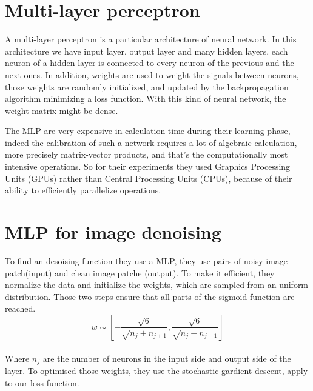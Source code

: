 \documentclass[10pt,a4paper]{article}
\newcommand{\svs}{\vspace{9pt}}
\begin{document}
\svs

\section{Multi-layer perceptron}

A multi-layer perceptron is a particular architecture of neural network. In this architecture we have input layer, output layer and many hidden layers, each neuron of a hidden layer is connected to every neuron of the previous and the next ones.  In addition, weights are used to weight the signals between neurons, those weights are randomly initialized, and updated by the backpropagation algorithm minimizing a loss function. With this kind of neural network, the weight matrix might be dense.


\svs 



The MLP are very expensive in calculation time during their learning phase, indeed the calibration of such a network requires a lot of algebraic calculation, more precisely matrix-vector products, and that's the computationally most intensive operations.
So for their experiments they used Graphics Processing Units (GPUs) rather than Central Processing Units (CPUs), because of their ability to efficiently parallelize operations.

\svs







\section{MLP for image denoising}


To find an desoising function they use a MLP, they use pairs of noisy image patch(input) and clean image patche (output). To make it efficient, they normalize the data and initialize the weights, which are sampled from an uniform distribution. Those two steps ensure that all parts of the sigmoid function are reached. \\%
$$w \sim [-\frac{\sqrt{6}}{\sqrt{n_j + n_{j+1}}}, \frac{\sqrt{6}}{\sqrt{n_j + n_{j+1}}} ]$$ \\
Where $n_j$ are the number of neurons in the input side and output side of the layer. To optimised those weights, they use the stochastic gardient descent, apply to our loss function.
\end{document}
